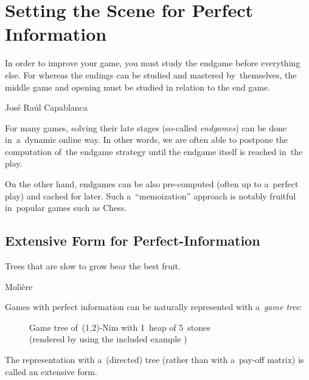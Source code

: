 \chapter{Setting the Scene for Perfect Information}
\epigraph{
  In order to improve your game, you must study the endgame before everything else.
  For whereas the endings can be studied and mastered by~themselves, the middle game and opening must be studied in relation to the end game.
}{José Raúl Capablanca}

For many games, solving their late stages (so-called \emph{endgames}) can be done in~a~dynamic online way.
In other words, we are often able to postpone the computation of~the endgame strategy until the endgame itself is reached in~the play.

On the other hand, endgames can be also pre-computed (often up to a~perfect play) and cached for later.
Such a~``memoization'' approach is notably fruitful in~popular games such as Chess.

\section{Extensive Form for Perfect-Information}
\label{sec:extensive-form-perf-info}
\epigraph{Trees that are slow to grow bear the best fruit.}
{Molière}
Games with perfect information can be naturally represented with a~\emph{game tree}:
\begin{figure}[H]
  \centering
  \scriptsize
  \def\svgwidth{.9\textwidth}
  
  \def\captionTitle{Game tree of~(1,2)-Nim with 1~heap of 5~stones}
  \caption[\captionTitle]{\captionTitle{}\\ (rendered by  using the included example )}
  \label{fig:game-tree-nim-5}
\end{figure}
\noindent
The representation with a~(directed) tree (rather than with a~pay-off matrix) is called an extensive form.

